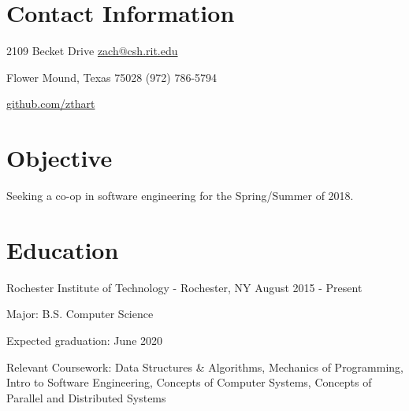 \documentclass[margin,line]{resume}
\newcommand{\rurl}[1]{\hfill {\footnotesize \url{#1}}}
\newcommand{\rdate}[1]{\hfill {\small #1}}
\begin{document}
\begin{resume}
\section{\mysidestyle Contact Information} 
	\begin{asparablank}
		\item 2109 Becket Drive  \hfill \href{mailto:zach@csh.rit.edu}{zach@csh.rit.edu}
		\item Flower Mound, Texas 75028 \hfill (972) 786-5794
		\item \hfill \rurl{github.com/zthart}
    \end{asparablank}

\section{\mysidestyle Objective}
	\begin{asparablank}
    	\item Seeking a co-op in software engineering for the Spring/Summer of 2018.
        \normalsize
        \\
	\end{asparablank}

\section{\mysidestyle Education}
	\begin{compactdesc}
		\item[Rochester Institute of Technology] - Rochester, NY \rdate{August 2015 - Present}
		\begin{compactitem} { \small
			\item Major: B.S. Computer Science
			\item Expected graduation: June 2020
            \item Relevant Coursework: Data Structures \& Algorithms, Mechanics of Programming, Intro to Software Engineering, Concepts of Computer Systems, Concepts of Parallel and Distributed Systems
		} \end{compactitem}
	\end{compactdesc}


\end{resume}
\end{document}
